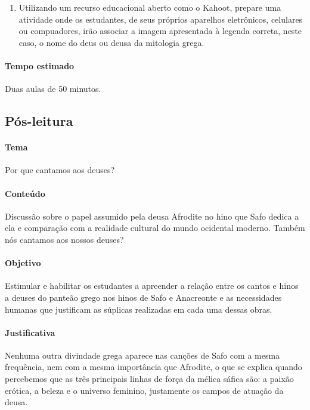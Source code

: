 \documentclass[12pt]{extarticle}
\begin{document}
\begin{enumerate}

	\item
	Utilizando um recurso educacional aberto como o Kahoot, prepare uma atividade onde os
	estudantes, de seus próprios aparelhos eletrônicos, celulares ou compuadores, irão 
	associar a imagem apresentada à legenda correta, neste caso, o nome do deus ou deusa 
	da mitologia grega. 

\end{enumerate}

\paragraph{Tempo estimado} Duas aulas de 50 minutos.




\subsection{Pós-leitura}

\paragraph{Tema} Por que cantamos aos deuses?

\paragraph{Conteúdo} Discussão sobre o papel assumido pela deusa Afrodite no hino que 
Safo dedica a ela e comparação com a realidade cultural do mundo ocidental moderno.
Também nós cantamos aos nossos deuses?

\paragraph{Objetivo} Estimular e habilitar os estudantes a apreender a relação
entre os cantos e hinos a deuses do panteão grego nos hinos de Safo e Anacreonte 
e as necessidades humanas que justificam as súplicas realizadas em cada uma
dessas obras. 

\paragraph{Justificativa} Nenhuma outra divindade grega aparece nas canções de Safo
com a mesma frequência, nem com a mesma importância que Afrodite, o que se explica
quando percebemos que as três principais linhas de força da mélica sáfica são:
a paixão erótica, a beleza e o universo feminino, justamente os campos de atuação da deusa.
\end{document}
